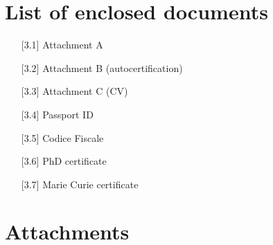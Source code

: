 \documentclass{article}
\begin{document}
{\center \section{List of enclosed documents}}


\begin{enumerate}
 \item[{[}3.1{]}] Attachment A
 \item[{[}3.2{]}] Attachment B (autocertification)
 \item[{[}3.3{]}] Attachment C (CV) 
 \item[{[}3.4{]}] Passport ID
 \item[{[}3.5{]}] Codice Fiscale
 \item[{[}3.6{]}] PhD certificate
 \item[{[}3.7{]}] Marie Curie certificate
 \end{enumerate}


\nocite{BMMRV17, BLMR17, GMRS16IJCAI}


{\small \printbibliography[prefixnumbers={Pubb. 4.}]
}
 


\newpage

\section{Attachments}

 

% 
 

\newpage

  
  \newpage
  
 


\end{document}
